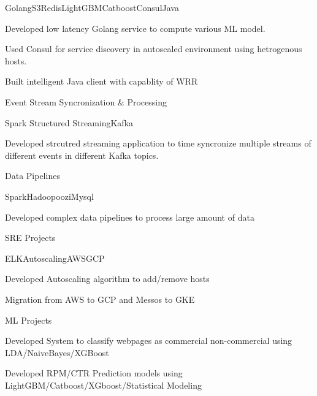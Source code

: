 \documentclass[10.5pt,a4paper]{article}
\begin{document}
\begin{multicols}{2}
\begin{expsubsec}{Golang{\textbar}S3{\textbar}Redis{\textbar}LightGBM{\textbar}Catboost{\textbar}Consul{\textbar}Java}
\end{expsubsec}
\begin{desc}{Developed low latency Golang service to compute various ML model.}
\end{desc}
\begin{desc}{Used Consul for service discovery in autoscaled environment using hetrogenous hosts. }
\end{desc}
\begin{desc}{Built intelligent Java client with capablity of WRR}
\end{desc}
\begin{expsec}{Event Stream Syncronization \& Processing}
\end{expsec}
\begin{expsubsec}{Spark Structured Streaming{\textbar}Kafka}
\end{expsubsec}
\begin{desc}{Developed strcutred streaming application to time syncronize multiple streams of different events in different Kafka topics.}
\end{desc}
\begin{expsec}{Data Pipelines}
\end{expsec}
\begin{expsubsec}{Spark{\textbar}Hadoop{\textbar}oozi{\textbar}Mysql}
\end{expsubsec}
\begin{desc}{Developed complex data pipelines to process large amount of data}
\end{desc}
\begin{expsec}{SRE Projects}
\end{expsec}
\begin{expsubsec}{ELK{\textbar}Autoscaling{\textbar}AWS{\textbar}GCP}
\end{expsubsec}
\begin{desc}{Developed Autoscaling algorithm to add/remove hosts}
\end{desc}
\begin{desc}{Migration from AWS to GCP and Messos to GKE}
\end{desc}
\begin{expsec}{ML Projects}
\end{expsec}
\begin{desc}{Developed System to classify webpages as commercial non-commercial using LDA/NaiveBayes/XGBoost}
\end{desc}
\begin{desc}{Developed RPM/CTR Prediction models using LightGBM/Catboost/XGboost/Statistical Modeling}

\end{desc}
\end{multicols}
\end{document}
